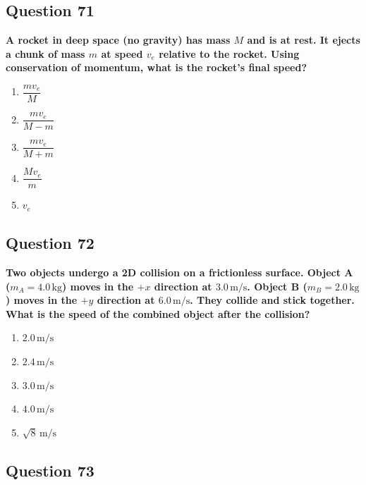 \documentclass[12pt,letterpaper]{article}
\begin{document}
\subsection{Question 71}

\begin{questionbox}
\textbf{A rocket in deep space (no gravity) has mass $M$ and is at rest. It ejects a chunk of mass $m$ at speed $v_e$ relative to the rocket. Using conservation of momentum, what is the rocket's final speed?}

\begin{enumerate}[label=\alph*)]
    \item $\dfrac{mv_e}{M}$
    \item $\dfrac{mv_e}{M - m}$
    \item $\dfrac{mv_e}{M + m}$
    \item $\dfrac{Mv_e}{m}$
    \item $v_e$
\end{enumerate}
\end{questionbox}

\subsection{Question 72}

\begin{questionbox}
\textbf{Two objects undergo a 2D collision on a frictionless surface. Object A ($m_A = 4.0\,\text{kg}$) moves in the $+x$ direction at $3.0\,\text{m/s}$. Object B ($m_B = 2.0\,\text{kg}$) moves in the $+y$ direction at $6.0\,\text{m/s}$. They collide and stick together. What is the speed of the combined object after the collision?}

\begin{enumerate}[label=\alph*)]
    \item $2.0\,\text{m/s}$
    \item $2.4\,\text{m/s}$
    \item $3.0\,\text{m/s}$
    \item $4.0\,\text{m/s}$
    \item $\sqrt{8}\,\text{m/s}$
\end{enumerate}
\end{questionbox}

\subsection{Question 73}
\end{document}
